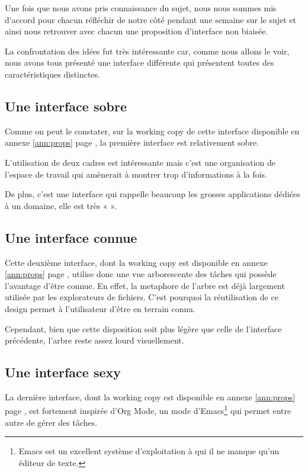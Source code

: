 \documentclass[11pt]{article}
\begin{document}
Une fois que nous avons pris connaissance du sujet, nous nous sommes
mis d'accord pour chacun réfléchir de notre côté pendant une semaine
sur le sujet et ainsi nous retrouver avec chacun une proposition
d'interface non biaisée.

La confrontation des idées fut très intéressante car, comme nous
allons le voir, nous avons tous présenté une interface différente qui
présentent toutes des caractéristiques distinctes.



\subsection{Une interface sobre}

Comme on peut le constater, sur la working copy de cette interface
disponible en annexe \ref{ann:props} page \pageref{fig:sobre}, la
première interface est relativement sobre.

L'utilisation de deux cadres est intéressante mais c'est une
organisation de l'espace de travail qui amènerait à montrer trop
d'informations à la fois.

De plus, c'est une interface qui rappelle beaucoup les grosses
applications dédiées à un domaine, elle est très «
». 


\subsection{Une interface connue}

Cette deuxième interface, dont la working copy est disponible en
annexe \ref{ann:props} page \pageref{fig:connue}, utilise donc une vue
arborescente des tâches qui possède l'avantage d'être connue. En
effet, la \gls{metaphore} de l'arbre est déjà largement utilisée par
les explorateurs de fichiers. C'est pourquoi la réutilisation de ce
design permet à l'utilisateur d'être en terrain connu.

Cependant, bien que cette disposition soit plus légère que celle de
l'interface précédente, l'arbre reste assez lourd visuellement.


\subsection{Une interface sexy}

La dernière interface, dont la working copy est disponible en annexe
\ref{ann:props} page \pageref{fig:sexy}, est fortement inspirée d'Org
Mode, un mode d'Emacs\footnote{Emacs est un excellent système
  d'exploitation à qui il ne manque qu'un éditeur de texte.} qui
permet entre autre de gérer des tâches.
\end{document}
